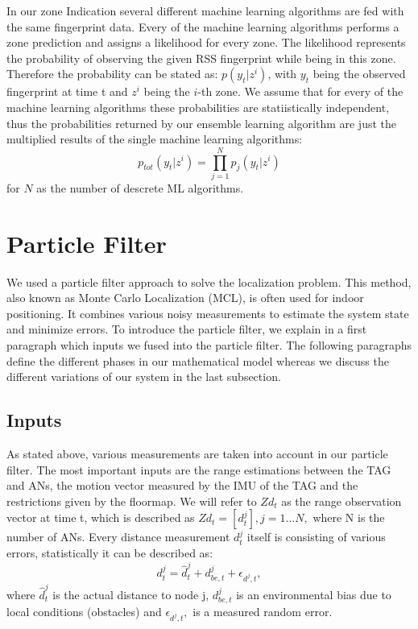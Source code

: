 In our zone Indication several different machine learning algorithms are fed with the same fingerprint data. Every of the machine learning algorithms performs a zone prediction and assigns a likelihood for every zone. The likelihood represents the probability of observing the given RSS fingerprint while being in this zone. Therefore the probability can be stated as: $p(y_{t} | z^{i})$, with $y_{t}$ being the observed fingerprint at time t and $z^{i}$ being the $i$-th zone. We assume that for every of the machine learning algorithms these probabilities are statiistically independent, thus the probabilities returned by our ensemble learning algorithm are just the multiplied results of the single machine learning algorithms: $$ p_{tot}(y_{t} | z^{i})=  \prod_{j=1}^{N} p_{j}(y_{t} | z^{i})$$ for $N$ as the number of descrete ML algorithms.





\section{Particle Filter}
We used a particle filter approach to solve the localization problem. This method, also known as Monte Carlo Localization (MCL), is often used for indoor positioning. It combines various noisy measurements to estimate the system state and minimize errors. To introduce the particle filter, we explain in a first paragraph which inputs we fused into the particle filter. The following paragraphs define the different phases in our mathematical model whereas we discuss the different variations of our system in the last subsection.

\subsection{Inputs}
As stated above, various measurements are taken into account in our particle filter. The most important inputs are the range estimations between the TAG and ANs, the motion vector measured by the IMU of the TAG and the restrictions given by the floormap. We will refer to $Zd_{t}$ as the range observation vector at time t, which is described as $Zd_{t} = [d^{j}_{t}], j = 1...N,$ where N is the number of ANs. Every distance measurement $d^{j}_{t}$ itself is consisting of various errors, statistically it can be described as: 
$$d^{j}_{t} = \hat{d}^{j}_{t} + d^{j}_{be, t} + \epsilon_{d^{j}, t},$$
where $\hat{d}^{j}_{t}$ is the actual distance to node j, $d^{j}_{be, t}$ is an environmental bias due to local conditions (obstacles) and $\epsilon_{d^{j}, t},$ is a measured random error.

